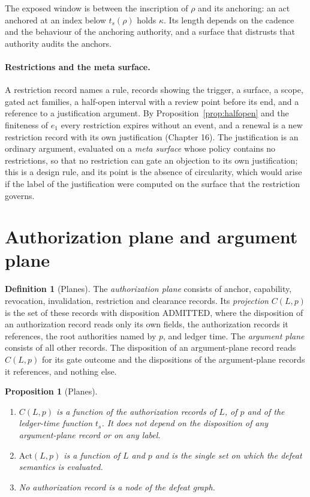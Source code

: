 \documentclass[11pt]{article}
\theoremstyle{plain}
\newtheorem{proposition}[theorem]{Proposition}
\theoremstyle{definition}
\newtheorem{definition}[theorem]{Definition}
\theoremstyle{remark}
\newcommand{\Act}{\mathrm{Act}}
\begin{document}
The exposed window is between the inscription of $\rho$ and its anchoring: an act anchored at an index below $t_s(\rho)$ holds $\kappa$. Its length depends on the cadence and the behaviour of the anchoring authority, and a surface that distrusts that authority audits the anchors.

\paragraph{Restrictions and the meta surface.} A restriction record names a rule, records showing the trigger, a surface, a scope, gated act families, a half-open interval with a review point before its end, and a reference to a justification argument. By Proposition~\ref{prop:halfopen} and the finiteness of $e_1$ every restriction expires without an event, and a renewal is a new restriction record with its own justification (Chapter 16). The justification is an ordinary argument, evaluated on a \emph{meta surface} whose policy contains no restrictions, so that no restriction can gate an objection to its own justification; this is a design rule, and its point is the absence of circularity, which would arise if the label of the justification were computed on the surface that the restriction governs.

\section{Authorization plane and argument plane}\label{sec:planes}

\begin{definition}[Planes]\label{def:planes}
The \emph{authorization plane} consists of anchor, capability, revocation, invalidation, restriction and clearance records. Its \emph{projection} $C(L,p)$ is the set of these records with disposition $\mathrm{ADMITTED}$, where the disposition of an authorization record reads only its own fields, the authorization records it references, the root authorities named by $p$, and ledger time. The \emph{argument plane} consists of all other records. The disposition of an argument-plane record reads $C(L,p)$ for its gate outcome and the dispositions of the argument-plane records it references, and nothing else.
\end{definition}

\begin{proposition}[Planes]\label{prop:planes}
\begin{enumerate}[label=(\alph*)]
\item $C(L,p)$ is a function of the authorization records of $L$, of $p$ and of the ledger-time function $t_s$. It does not depend on the disposition of any argument-plane record or on any label.
\item $\Act(L,p)$ is a function of $L$ and $p$ and is the single set on which the defeat semantics is evaluated.
\item No authorization record is a node of the defeat graph.
\end{enumerate}
\end{proposition}
\end{document}
